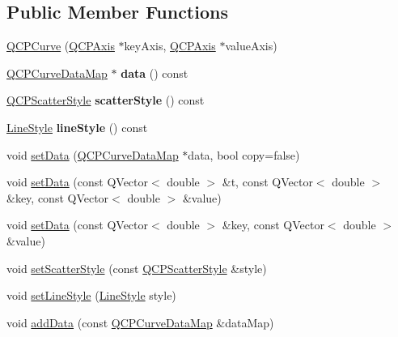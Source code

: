 \subsection*{Public Member Functions}
\begin{DoxyCompactItemize}
\item 
\hyperlink{class_q_c_p_curve_a36de58e2652b3fa47bdf9187d421d3ce}{Q\+C\+P\+Curve} (\hyperlink{class_q_c_p_axis}{Q\+C\+P\+Axis} $\ast$key\+Axis, \hyperlink{class_q_c_p_axis}{Q\+C\+P\+Axis} $\ast$value\+Axis)
\item 
\hypertarget{class_q_c_p_curve_a667ca2594cf651e3032c624dbaa95add}{}\label{class_q_c_p_curve_a667ca2594cf651e3032c624dbaa95add} 
\hyperlink{qcustomplot_8h_a444d37ec9cb2951b3a7fe443c34d1658}{Q\+C\+P\+Curve\+Data\+Map} $\ast$ {\bfseries data} () const
\item 
\hypertarget{class_q_c_p_curve_afa6bd72a3a331a5ed45d3e0c5843b592}{}\label{class_q_c_p_curve_afa6bd72a3a331a5ed45d3e0c5843b592} 
\hyperlink{class_q_c_p_scatter_style}{Q\+C\+P\+Scatter\+Style} {\bfseries scatter\+Style} () const
\item 
\hypertarget{class_q_c_p_curve_a06e3cf3f8f1add689254b3cda66e040e}{}\label{class_q_c_p_curve_a06e3cf3f8f1add689254b3cda66e040e} 
\hyperlink{class_q_c_p_curve_a2710e9f79302152cff794c6e16cc01f1}{Line\+Style} {\bfseries line\+Style} () const
\item 
void \hyperlink{class_q_c_p_curve_a631ac886708460013b30052f49cbc9da}{set\+Data} (\hyperlink{qcustomplot_8h_a444d37ec9cb2951b3a7fe443c34d1658}{Q\+C\+P\+Curve\+Data\+Map} $\ast$data, bool copy=false)
\item 
void \hyperlink{class_q_c_p_curve_affe80e011e2ced62a88f614acd6ab8d1}{set\+Data} (const Q\+Vector$<$ double $>$ \&t, const Q\+Vector$<$ double $>$ \&key, const Q\+Vector$<$ double $>$ \&value)
\item 
void \hyperlink{class_q_c_p_curve_a963d4c45777deef15848a8f56172d066}{set\+Data} (const Q\+Vector$<$ double $>$ \&key, const Q\+Vector$<$ double $>$ \&value)
\item 
void \hyperlink{class_q_c_p_curve_a55e43b44709bf50a35500644988aa706}{set\+Scatter\+Style} (const \hyperlink{class_q_c_p_scatter_style}{Q\+C\+P\+Scatter\+Style} \&style)
\item 
void \hyperlink{class_q_c_p_curve_a4a377ec863ff81a1875c3094a6177c19}{set\+Line\+Style} (\hyperlink{class_q_c_p_curve_a2710e9f79302152cff794c6e16cc01f1}{Line\+Style} style)
\item 
void \hyperlink{class_q_c_p_curve_a4e24023c3b9ac75440c7a260172c99af}{add\+Data} (const \hyperlink{qcustomplot_8h_a444d37ec9cb2951b3a7fe443c34d1658}{Q\+C\+P\+Curve\+Data\+Map} \&data\+Map)

\end{DoxyCompactItemize}
